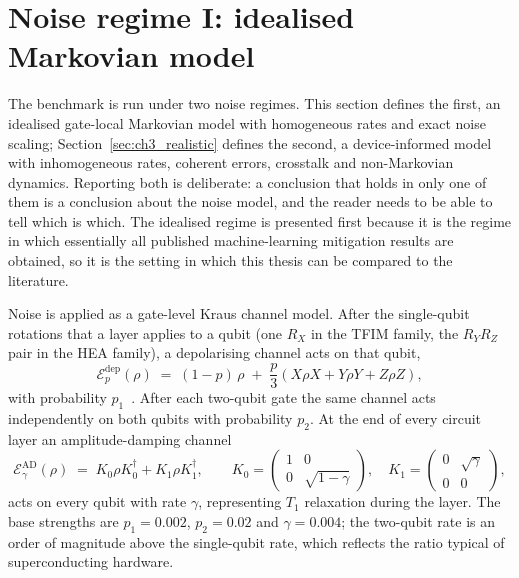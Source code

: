 \documentclass[Thesis.tex]{subfiles}
\begin{document}
\section{Noise regime I: idealised Markovian model}\label{sec:ch3_noise}

The benchmark is run under two noise regimes. This section defines the first, an
idealised gate-local Markovian model with homogeneous rates and exact noise
scaling; Section~\ref{sec:ch3_realistic} defines the second, a device-informed
model with inhomogeneous rates, coherent errors, crosstalk and non-Markovian
dynamics. Reporting both is deliberate: a conclusion that holds in only one of them
is a conclusion about the noise model, and the reader needs to be able to tell which
is which. The idealised regime is presented first because it is the regime in which
essentially all published machine-learning mitigation results are obtained, so it is
the setting in which this thesis can be compared to the literature.

Noise is applied as a gate-level Kraus channel model. After the single-qubit
rotations that a layer applies to a qubit (one $R_X$ in the TFIM family, the
$R_Y R_Z$ pair in the HEA family), a depolarising channel acts on that qubit,
\begin{equation}
    \mathcal{E}^{\text{dep}}_{p}(\rho) \;=\; (1 - p)\,\rho \;+\; \frac{p}{3}
    \left( X \rho X + Y \rho Y + Z \rho Z \right),
    \label{eq:ch3_depol}
\end{equation}
with probability $p_1$~\cite{nielsen2012book}. After each two-qubit gate the same channel acts
independently on both qubits with probability $p_2$. At the end of every circuit
layer an amplitude-damping channel
\begin{equation}
    \mathcal{E}^{\text{AD}}_{\gamma}(\rho) \;=\; K_0 \rho K_0^{\dagger} + K_1 \rho K_1^{\dagger},
    \qquad
    K_0 = \begin{pmatrix} 1 & 0 \\ 0 & \sqrt{1 - \gamma} \end{pmatrix},
    \quad
    K_1 = \begin{pmatrix} 0 & \sqrt{\gamma} \\ 0 & 0 \end{pmatrix},
    \label{eq:ch3_ad}
\end{equation}
acts on every qubit with rate $\gamma$, representing $T_1$ relaxation during the
layer. The base strengths are $p_1 = 0.002$, $p_2 = 0.02$ and $\gamma = 0.004$; the
two-qubit rate is an order of magnitude above the single-qubit rate, which reflects
the ratio typical of superconducting hardware.
\end{document}
